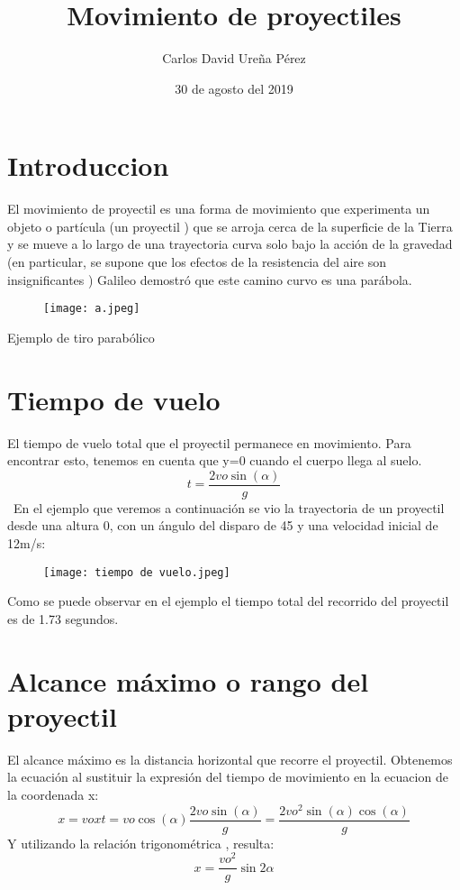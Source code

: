 \documentclass{article}
\title{Movimiento de proyectiles}
\author{Carlos David Ureña Pérez }
\date{30 de agosto del 2019}
\begin{document}
\maketitle

\section{Introduccion}

El movimiento de proyectil es una forma de movimiento que experimenta un objeto o partícula (un proyectil ) que se arroja cerca de la superficie de la Tierra y se mueve a lo largo de una trayectoria curva solo bajo la acción de la gravedad (en particular, se supone que los efectos de la resistencia del aire son insignificantes ) Galileo demostró que este camino curvo es una parábola.

\begin{wrapfigure}
\begin{center}
\texttt{[image: a.jpeg]}
\end{center}
\end{wrapfigure}
\caption{Ejemplo de tiro parabólico}
\centering

\section{Tiempo de vuelo}
El tiempo de vuelo total que el proyectil permanece en movimiento.
Para encontrar esto, tenemos en cuenta que y=0 cuando el cuerpo llega al suelo.
\begin{equation}
t=\frac{2vo\sin(\alpha)}{g}
\end{equation}\
En el ejemplo que veremos a continuación se vio la trayectoria de un proyectil desde una altura 0, con un ángulo del disparo de 45 y una velocidad inicial de 12m/s:
\begin{wrapfigure}
\begin{center}
\texttt{[image: tiempo de vuelo.jpeg]}
\end{center}
\end{wrapfigure}
Como se puede observar en el ejemplo el tiempo total del recorrido del proyectil es de 1.73 segundos.
\section{Alcance máximo o rango del proyectil}
El alcance máximo es la distancia horizontal que recorre el proyectil. Obtenemos la ecuación al sustituir la expresión del tiempo de movimiento en la ecuacion de la coordenada x:
\begin{equation}
    x=voxt=vo \cos (\alpha) \frac{2vo\sin (\alpha)}{g}=\frac{2vo^2\sin (\alpha)\cos(\alpha)}{g}
\end{equation}
Y utilizando la relación trigonométrica \sin \alpha \cos \alpha , resulta:
\\
\begin{equation}
    x=\frac{vo^2}{g}\sin 2 \alpha
\end{equation}
\end{document}
